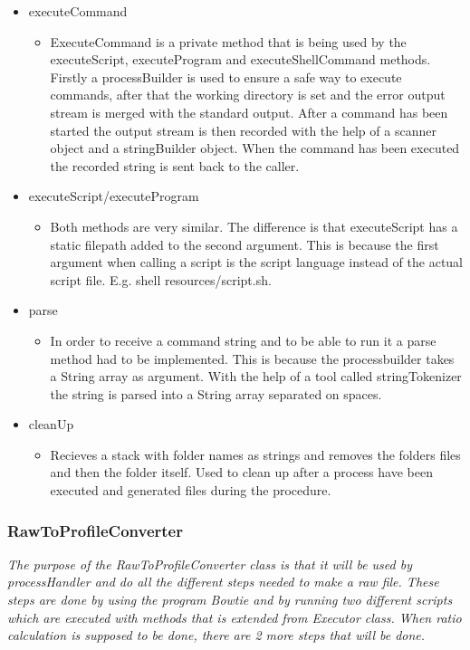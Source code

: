 \begin{itemize} 
\item executeCommand
\begin{itemize}
\item ExecuteCommand is a private method that is being used by the executeScript, executeProgram and executeShellCommand methods. Firstly a processBuilder is used to ensure a safe way to execute commands, after that the working directory is set and the error output stream is merged with the standard output.
After a command has been started the output stream is then recorded with the help of a scanner object and a stringBuilder object. When the command has been executed the recorded string is sent back to the caller.
\end{itemize}
\item executeScript/executeProgram
\begin{itemize}
\item Both methods are very similar. The difference is that executeScript has a static filepath added to the second argument. This is because the first argument when calling a script is the script language instead of the actual script file. E.g. shell resources/script.sh.
\end{itemize}

\item parse
\begin{itemize}
\item In order to receive a command string and to be able to run it a parse method had to be implemented. This is because the processbuilder takes a String array as argument. With the help of a tool called stringTokenizer the string is parsed into a String array separated on spaces.
\end{itemize}
 
\item cleanUp
\begin{itemize}
\item Recieves a stack with folder names as strings and removes the folders files and then the folder itself. Used to clean up after a process have been executed and generated files during the procedure. 
\end{itemize}

\end{itemize}

\subsubsection{RawToProfileConverter}
\emph{The purpose of the RawToProfileConverter class is that it will be used by processHandler and do all the different steps needed to make a raw file. These steps are done by using the program Bowtie and by running two different scripts which are executed with methods that is extended from Executor class. When ratio calculation is supposed to be done, there are 2 more steps that will be done.}

